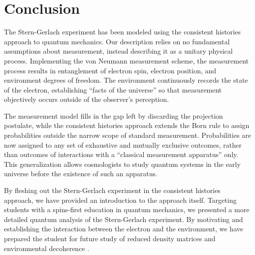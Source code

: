 \chapter{Conclusion}
The Stern-Gerlach experiment has been modeled using the consistent histories approach to quantum mechanics. Our description relies on no fundamental assumptions about measurement, instead describing it as a unitary physical process. Implementing the von Neumann measurement scheme, the measurement process results in entanglement of electron spin, electron position, and environment degrees of freedom. The environment continuously records the state of the electron, establishing ``facts of the universe'' so that measurement objectively occurs outside of the observer's perception.

The measurement model fills in the gap left by discarding the projection postulate, while the consistent histories approach extends the Born rule to assign probabilities outside the narrow scope of standard measurement. Probabilities are now assigned to any set of exhaustive and mutually exclusive outcomes, rather than outcomes of interactions with a ``classical measurement apparatus'' only. This generalization allows cosmologists to study quantum systems in the early universe before the existence of such an apparatus.

By fleshing out the Stern-Gerlach experiment in the consistent histories approach, we have provided an introduction to the approach itself. Targeting students with a spins-first education in quantum mechanics, we presented a more detailed quantum analysis of the Stern-Gerlach experiment. By motivating and establishing the interaction between the electron and the environment, we have prepared the student for future study of reduced density matrices and environmental decoherence \cite{Schlosshauer}.

{}





